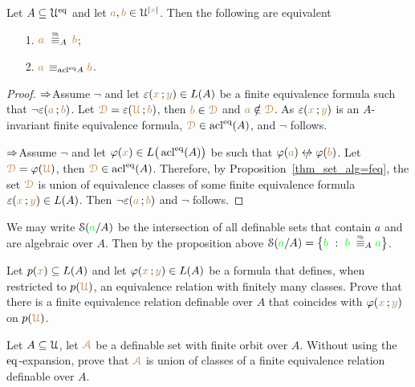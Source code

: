 \documentclass[creche.tex]{subfiles}
\begin{document}
\begin{proposition}\label{prop_Shelah_strong_types}
Let $A\subseteq\EuScript U^{{\rm eq}}$ and let ${\color{brown} a},{\color{brown} b}\in\EuScript U^{|{\color{brown} x}|}$.
Then the following are equivalent\nobreak
\begin{itemize}
\item[1.]  ${\mr a}\ \equivSh_A\, {\mr b}$;
\item[2.]  ${\color{brown} a}\,\equiv_{\mathop{\rm acl}^{{\rm eq}}\! A}{\color{brown} b}$.
\end{itemize} 
\end{proposition}
\begin{proof}
$\Rightarrow$\quad Assume $\neg$ and let $\varepsilon({\color{brown} x}\,;{\color{brown} y})\in L(A)$ be a finite equivalence formula such that $\neg\varepsilon({\color{brown} a}\,;{\color{brown} b})$.
Let ${\color{brown}\EuScript D}=\varepsilon({\color{brown}\EuScript U}\,;{\color{brown} b})$, then  ${\color{brown} b}\in{\color{brown}\EuScript D}$ and ${\color{brown} a}\notin{\color{brown}\EuScript D}$.
As $\varepsilon({\color{brown} x}\,;{\color{brown} y})$ is an $A$-invariant finite equivalence formula, ${\color{brown}\EuScript D}\in\mathop{\rm acl}^{{\rm eq}}(A)$, and $\neg$ follows.


$\Rightarrow$\quad Assume $\neg$ and let $\varphi({\color{brown} x})\in L\big(\mathop{\rm acl}^{{\rm eq}}(A)\big)$ be  such that $\phi({\mr a})\niff\phi({\mr b})$.
Let ${\color{brown}\EuScript D}=\varphi({\color{brown}\EuScript U})$, then ${\color{brown}\EuScript D}\in\mathop{\rm acl}^{{\rm eq}}(A)$.
Therefore, by Proposition~\ref{thm_set_alg=feq}, the set ${\color{brown}\EuScript D}$ is union of equivalence classes of some finite equivalence formula $\varepsilon({\color{brown} x}\,;{\color{brown} y})\in L(A)$.
Then $\neg\varepsilon({\color{brown} a}\,;{\color{brown} b})$ and $\neg$ follows.
\end{proof}

We may write \emph{$\EuScript S({\color{green} a}/A)$\/} be the intersection of all definable sets that contain $a$ and are algebraic over $A$.
Then by the proposition above $\S({\gr a}/A)=\big\{{\gr b}\ :\ {\gr b}\;\equivSh_A {\gr a}\big\}$.


\begin{exercise}
Let $p({\color{brown} x})\subseteq L(A)$ and let $\varphi({\color{brown} x}\,;{\color{brown} y})\in L(A)$ be a formula that defines, when restricted to $p({\color{brown}\EuScript U})$, an equivalence relation with finitely many classes.
Prove that there is a finite equivalence relation definable over $A$ that coincides with $\varphi({\color{brown} x}\,;{\color{brown} y})$ on $p({\color{brown}\EuScript U})$.\QED
\end{exercise}

\begin{exercise}\label{ex_feqthm_senza_eq}
Let $A\subseteq\EuScript U$, let ${\color{brown}\EuScript A}$ be a definable set with finite orbit over $A$.
Without using the ${{\rm eq}}$-expansion, prove that ${\color{brown}\EuScript A}$ is union of classes of a finite equivalence relation definable over $A$.\QED
\end{exercise}
\end{document}

